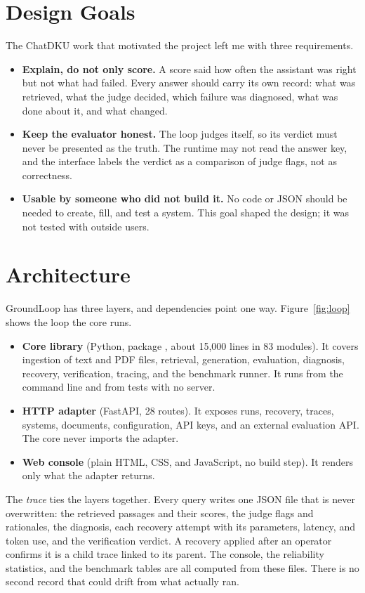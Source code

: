 \documentclass[12pt, a4paper, oneside]{report}
\newcommand{\code}[1]{\texttt{\detokenize{#1}}}
\begin{document}
\section{Design Goals}

The ChatDKU work that motivated the project left me with three requirements.
\begin{itemize}
\item \textbf{Explain, do not only score.} A score said how often the
  assistant was right but not what had failed. Every answer should carry its
  own record: what was retrieved, what the judge decided, which failure was
  diagnosed, what was done about it, and what changed.
\item \textbf{Keep the evaluator honest.} The loop judges itself, so its
  verdict must never be presented as the truth. The runtime may not read the
  answer key, and the interface labels the verdict as a comparison of judge
  flags, not as correctness.
\item \textbf{Usable by someone who did not build it.} No code or JSON
  should be needed to create, fill, and test a system. This goal shaped
  the design; it was not tested with outside users.
\end{itemize}

\section{Architecture}

GroundLoop has three layers, and dependencies point one way.
Figure~\ref{fig:loop} shows the loop the core runs.

\begin{itemize}
\item \textbf{Core library} (Python, package \code{swrag}, about 15{,}000
  lines in 83 modules). It covers ingestion of text and PDF files, retrieval,
  generation, evaluation, diagnosis, recovery, verification, tracing, and the
  benchmark runner. It runs from the command line and from tests with no
  server.
\item \textbf{HTTP adapter} (FastAPI, 28 routes). It exposes runs, recovery,
  traces, systems, documents, configuration, API keys, and an external
  evaluation API. The core never imports the adapter.
\item \textbf{Web console} (plain HTML, CSS, and JavaScript, no build step).
  It renders only what the adapter returns.
\end{itemize}

The \emph{trace} ties the layers together. Every query writes one JSON file
that is never overwritten: the retrieved passages and their scores, the
judge flags and rationales, the diagnosis, each recovery attempt with its
parameters, latency, and token use, and the verification verdict. A
recovery applied after an operator confirms it is a child trace linked to
its parent. The console, the reliability statistics, and the benchmark
tables are all computed from these files. There is no second record that
could drift from what actually ran.
\end{document}
